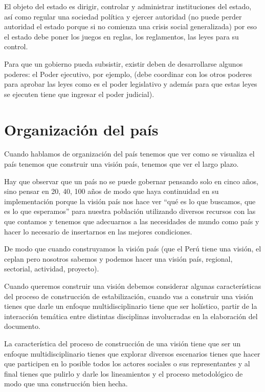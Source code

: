 \documentclass[
  letterpaper,
  DIV=11,
  numbers=noendperiod]{scrartcl}
\begin{document}
El objeto del estado es dirigir, controlar y administrar instituciones
del estado, así como regular una sociedad política y ejercer autoridad
(no puede perder autoridad el estado porque si no comienza una crisis
social generalizada) por eso el estado debe poner los juegos en reglas,
los reglamentos, las leyes para su control.

Para que un gobierno pueda subsistir, existir deben de desarrollarse
algunos poderes: el Poder ejecutivo, por ejemplo, (debe coordinar con
los otros poderes para aprobar las leyes como es el poder legislativo y
además para que estas leyes se ejecuten tiene que ingresar el poder
judicial).

\hypertarget{organizaciuxf3n-del-pauxeds}{%
\section{Organización del país}\label{organizaciuxf3n-del-pauxeds}}

Cuando hablamos de organización del país tenemos que ver como se
visualiza el país tenemos que construir una visión país, tenemos que ver
el largo plazo.

Hay que observar que un país no se puede gobernar pensando solo en cinco
años, sino pensar en 20, 40, 100 años de modo que haya continuidad en su
implementación porque la visión país nos hace ver ``qué es lo que
buscamos, que es lo que esperamos'' para nuestra población utilizando
diversos recursos con las que contamos y tenemos que adecuarnos a las
necesidades de mundo como país y hacer lo necesario de insertarnos en
las mejores condiciones.

De modo que cuando construyamos la visión país (que el Perú tiene una
visión, el ceplan pero nosotros sabemos y podemos hacer una visión país,
regional, sectorial, actividad, proyecto).

Cuando queremos construir una visión debemos considerar algunas
características del proceso de construcción de estabilización, cuando
vas a construir una visión tienes que darle un enfoque
multidisciplinario tiene que ser holístico, partir de la interacción
temática entre distintas disciplinas involucradas en la elaboración del
documento.

La característica del proceso de construcción de una visión tiene que
ser un enfoque multidisciplinario tienes que explorar diversos
escenarios tienes que hacer que participen en lo posible todos los
actores sociales o sus representantes y al final tienes que pulirlo y
darle los lineamientos y el proceso metodológico de modo que una
construcción bien hecha.
\end{document}
